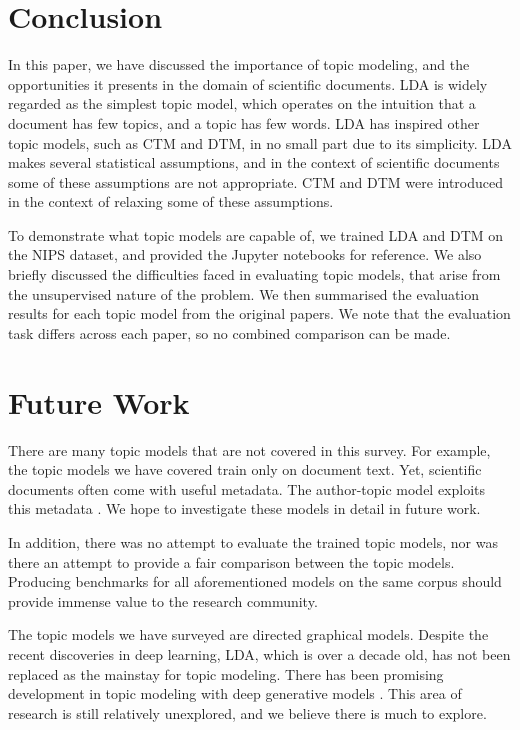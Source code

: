 \documentclass[letterpaper]{article}
\begin{document}
\section{Conclusion}
In this paper, we have discussed the importance of topic modeling, and
the opportunities it presents in the domain of scientific documents.
LDA is widely regarded as the simplest topic model, which operates on
the intuition that a document has few topics, and a topic has few
words. LDA has inspired other topic models, such as CTM and DTM, in no
small part due to its simplicity. LDA makes several statistical
assumptions, and in the context of scientific documents some of these
assumptions are not appropriate. CTM and DTM were introduced in
the context of relaxing some of these assumptions.

To demonstrate what topic models are capable of, we trained LDA and
DTM on the NIPS dataset, and provided the Jupyter notebooks for
reference. We also briefly discussed the difficulties faced in
evaluating topic models, that arise from the unsupervised nature of
the problem. We then summarised the evaluation results for each topic
model from the original papers. We note that the evaluation task
differs across each paper, so no combined comparison can be made.

\section{Future Work}
There are many topic models that are not covered in this survey. For
example, the topic models we have covered train only on document text.
Yet, scientific documents often come with useful metadata. The
author-topic model exploits this metadata \cite{rosen2004author}. We
hope to investigate these models in detail in future work.

In addition, there was no attempt to evaluate the trained topic
models, nor was there an attempt to provide a fair comparison between
the topic models. Producing benchmarks for all aforementioned models
on the same corpus should provide immense value to the research
community.

The topic models we have surveyed are directed graphical models.
Despite the recent discoveries in deep learning, LDA, which is over a
decade old, has not been replaced as the mainstay for topic modeling.
There has been promising development in topic modeling with deep
generative models \cite{hinton2009replicated, larochelle2012neural,
  cao2015novel}. This area of research is still relatively unexplored,
and we believe there is much to explore.
\end{document}
